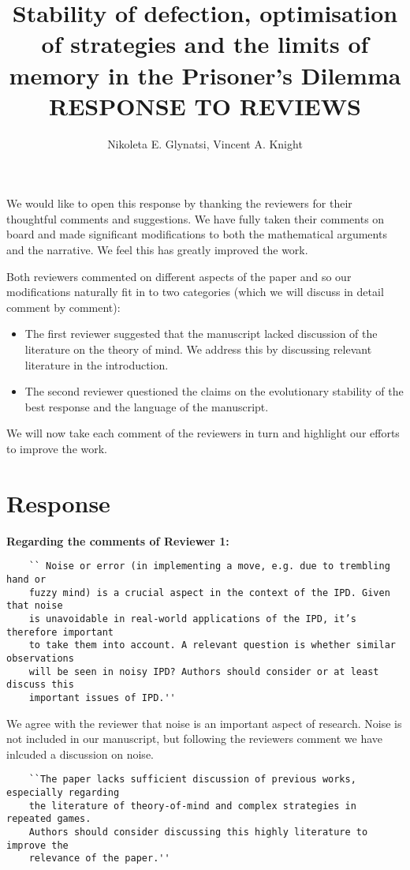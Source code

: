 \documentclass{article}
\title{Stability of defection, optimisation of strategies and the limits of
memory in the Prisoner's Dilemma RESPONSE TO REVIEWS}
\author{Nikoleta E. Glynatsi, Vincent A. Knight}
\begin{document}
\maketitle

We would like to open this response by thanking the reviewers for their
thoughtful comments and suggestions. We have fully taken their comments on board
and made significant modifications to both the mathematical arguments and the
narrative. We feel this has greatly improved the work.

Both reviewers commented on different aspects of the paper and so our
modifications naturally fit in to two categories (which we will discuss in
detail comment by comment):

\begin{itemize}
    \item The first reviewer suggested that the manuscript lacked discussion of
    the literature on the theory of mind. We address this by discussing relevant
    literature in the introduction.
    \item The second reviewer questioned the claims on the evolutionary
    stability of the best response and the language of the manuscript.
\end{itemize}

We will now take each comment of the reviewers in turn and highlight our efforts
to improve the work.

\section{Response}

\textbf{Regarding the comments of Reviewer 1:}

\begin{verbatim}
    `` Noise or error (in implementing a move, e.g. due to trembling hand or
    fuzzy mind) is a crucial aspect in the context of the IPD. Given that noise
    is unavoidable in real-world applications of the IPD, it’s therefore important
    to take them into account. A relevant question is whether similar observations
    will be seen in noisy IPD? Authors should consider or at least discuss this
    important issues of IPD.''
\end{verbatim}

We agree with the reviewer that noise is an important aspect of research. Noise
is not included in our manuscript, but following the reviewers comment we have
inlcuded a discussion on noise.

\begin{verbatim}
    ``The paper lacks sufficient discussion of previous works, especially regarding
    the literature of theory-of-mind and complex strategies in repeated games.
    Authors should consider discussing this highly literature to improve the
    relevance of the paper.''
\end{verbatim}
\end{document}
